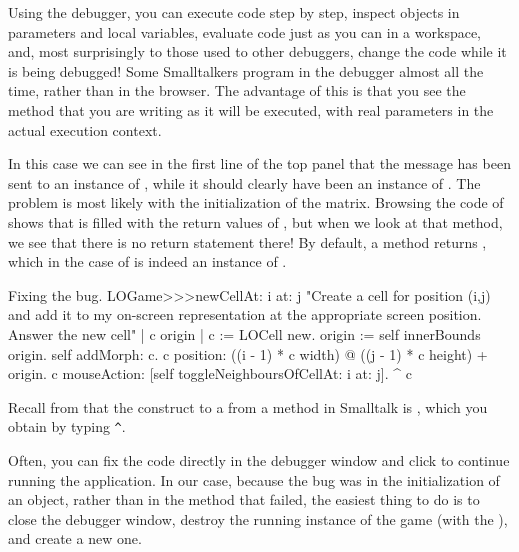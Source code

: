 \documentclass[a4paper,10pt,twoside]{book}
\begin{document}
Using the debugger, you can execute code step by step, inspect objects in parameters and local variables, evaluate code just as you can in a workspace, and, most surprisingly to those used to other debuggers, change the code while it is being debugged! Some Smalltalkers program in the debugger almost all the time, rather than in the browser.  The advantage of this is that you see the method that you are writing as it will be executed, with real parameters in the actual execution context.

In this case we can see in the first line of the top panel that the  message has been sent to an instance of , while it should clearly have been an instance of .
The problem is most likely with the initialization of the  matrix.
Browsing the code of  shows that  is filled with the return values of , but when we look at that method, we see that there is no return statement there!
By default, a method returns , which in the case of  is indeed an instance of .

\dothis{Close the debugger window.
Add the expression ``\ct{^ c}'' to the end of the method \ct{LOGame>>>newCellAt:at:} so that it returns \ct{c}.
(See \mthref{newCellAt:at:nobug}.)}

\begin{method}{Fixing the bug.}
LOGame>>>newCellAt: i at: j
   "Create a cell for position (i,j) and add it to my on-screen
   representation at the appropriate screen position.  Answer the new cell"
   | c origin |
   c := LOCell new.
   origin := self innerBounds origin.
   self addMorph: c.
   c position: ((i - 1) * c width) @ ((j - 1) * c height) + origin.
   c mouseAction: [self toggleNeighboursOfCellAt: i at: j].
   ^ c
\end{method}

\noindent
Recall from  that the construct to  a  from a method in Smalltalk is \ct{^}, which you obtain by typing \verb|^|.

Often, you can fix the code directly in the debugger window and click  to continue running the application.
In our case, because the bug was in the initialization of an object, rather than in the method that failed, the easiest thing to do is to close the debugger window, destroy the running instance of the game (with the ), and create a new one.
\end{document}
